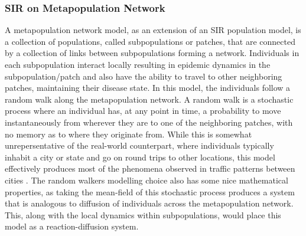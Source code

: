 \subsubsection{SIR on Metapopulation Network}
A metapopulation network model, as an extension of an SIR population model, is a collection of populations, called subpopulations or patches, that are connected by a collection of links between subpopulations forming a network. Individuals in each subpopulation interact locally resulting in epidemic dynamics in the subpopulation/patch and also have the ability to travel to other neighboring patches, maintaining their disease state. In this model, the individuals follow a random walk along the metapopulation network. A random walk is a stochastic process where an individual has, at any point in time, a probability to move instantaneously from wherever they are to one of the neighboring patches, with no memory as to where they originate from.
While this is somewhat unrepersentative of the real-world counterpart, where individuals typically inhabit a city or state and go on round trips to other locations, this model effectively produces most of the phenomena observed in traffic patterns between cities \cite{shao2022epidemic}.
The random walkers modelling choice also has some nice mathematical properties, as taking the mean-field of this stochastic process produces a system that is analogous to diffusion of individuals across the metapopulation network\cite{masuda2017random}.
This, along with the local dynamics within subpopulations, would place this model as a reaction-diffusion system\cite{colizza2007reaction}.\\


